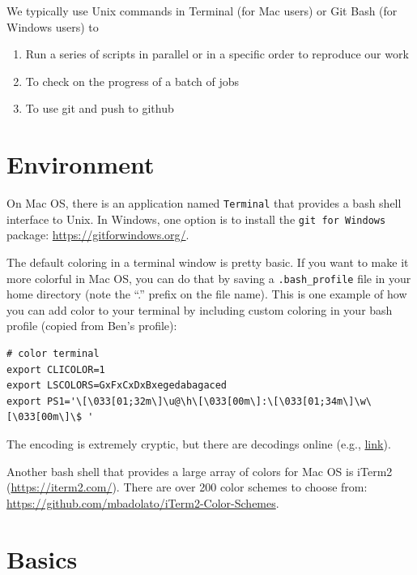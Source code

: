 \documentclass[]{book}
\providecommand{\tightlist}{%
  \setlength{\itemsep}{0pt}\setlength{\parskip}{0pt}}
\begin{document}
We typically use Unix commands in Terminal (for Mac users) or Git Bash (for Windows users) to

\begin{enumerate}
\def\labelenumi{\arabic{enumi}.}
\tightlist
\item
  Run a series of scripts in parallel or in a specific order to reproduce our work
\item
  To check on the progress of a batch of jobs
\item
  To use git and push to github
\end{enumerate}

\hypertarget{environment}{%
\section{Environment}\label{environment}}

On Mac OS, there is an application named \texttt{Terminal} that provides a bash shell interface to Unix. In Windows, one option is to install the \texttt{git\ for\ Windows} package: \url{https://gitforwindows.org/}.

The default coloring in a terminal window is pretty basic. If you want to make it more colorful in Mac OS, you can do that by saving a \texttt{.bash\_profile} file in your home directory (note the ``.'' prefix on the file name). This is one example of how you can add color to your terminal by including custom coloring in your bash profile (copied from Ben's profile):

\begin{verbatim}
# color terminal
export CLICOLOR=1
export LSCOLORS=GxFxCxDxBxegedabagaced
export PS1='\[\033[01;32m\]\u@\h\[\033[00m\]:\[\033[01;34m\]\w\[\033[00m\]\$ '
\end{verbatim}

The encoding is extremely cryptic, but there are decodings online (e.g., \href{http://www.marinamele.com/2014/05/customize-colors-of-your-terminal-in-mac-os-x.html}{link}).

Another bash shell that provides a large array of colors for Mac OS is iTerm2 (\url{https://iterm2.com/}). There are over 200 color schemes to choose from: \url{https://github.com/mbadolato/iTerm2-Color-Schemes}.

\hypertarget{basics-1}{%
\section{Basics}\label{basics-1}}
\end{document}
